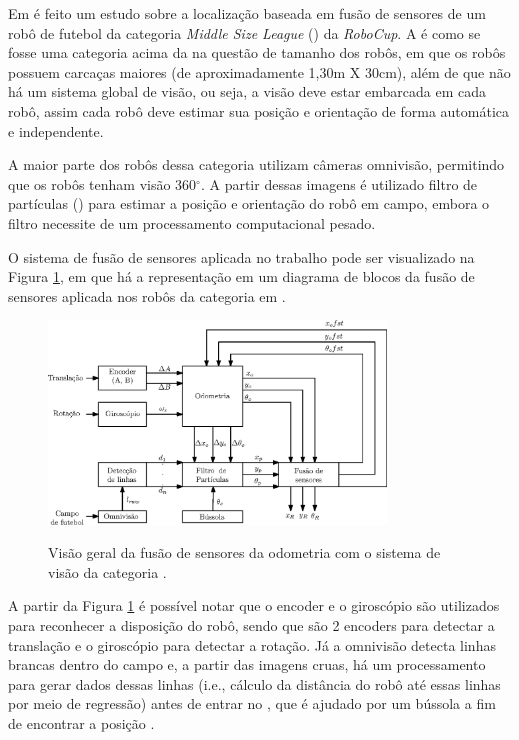 \documentclass[acronym, symbols, table, deposito]{fei}
\begin{document}
Em \textcite{ismail2022soccer} é feito um estudo sobre a localização baseada em fusão de sensores de um robô de futebol da categoria \textit{Middle Size League} () da \textit{RoboCup}. A  é como se fosse uma categoria acima da  na questão de tamanho dos robôs, em que os robôs possuem carcaças maiores (de aproximadamente 1,30m X 30cm), além de que não há um sistema global de visão, ou seja, a visão deve estar embarcada em cada robô, assim cada robô deve estimar sua posição e orientação de forma automática e independente.

A maior parte dos robôs dessa categoria utilizam câmeras omnivisão, permitindo que os robôs tenham visão 360$^\circ$. A partir dessas imagens é utilizado filtro de partículas () para estimar a posição e orientação do robô em campo, embora o filtro necessite de um processamento computacional pesado.

O sistema de fusão de sensores aplicada no trabalho pode ser visualizado na Figura \ref{fig:msl_sensor_fusion}, em que há a representação em um diagrama de blocos da fusão de sensores aplicada nos robôs da categoria  em \textcite{ismail2022soccer}.

\begin{figure}[!htb]
	\centering
	\caption{Visão geral da fusão de sensores da odometria com o sistema de visão da categoria .} 
	\includegraphics[width=0.8\textwidth]{msl_sensor_fusion.eps}
	\label{fig:msl_sensor_fusion}
\end{figure}

A partir da Figura \ref{fig:msl_sensor_fusion} é possível notar que o encoder e o giroscópio são utilizados para reconhecer a disposição do robô, sendo que são 2 encoders para detectar a translação e o giroscópio para detectar a rotação. Já a omnivisão detecta linhas brancas dentro do campo e, a partir das imagens cruas, há um processamento para gerar dados dessas linhas (i.e., cálculo da distância do robô até essas linhas por meio de regressão) antes de entrar no , que é ajudado por um bússola a fim de encontrar a posição .
\end{document}
